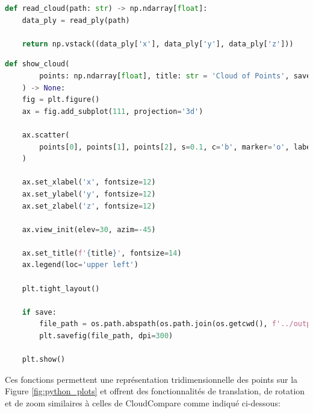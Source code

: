 \documentclass[../5RO17_TP4.tex]{subfiles}
\begin{document}
\begin{scriptsize}\mycode
	\begin{lstlisting}[language=Python, caption=\texttt{read\_cloud()}]
 def read_cloud(path: str) -> np.ndarray[float]:
    data_ply = read_ply(path)

    return np.vstack((data_ply['x'], data_ply['y'], data_ply['z']))
	\end{lstlisting}
\end{scriptsize}

\begin{scriptsize}\mycode
	\begin{lstlisting}[language=Python, caption=\texttt{show\_cloud()}]
def show_cloud(
        points: np.ndarray[float], title: str = 'Cloud of Points', save: bool = False
    ) -> None:
    fig = plt.figure()
    ax = fig.add_subplot(111, projection='3d')

    ax.scatter(
        points[0], points[1], points[2], s=0.1, c='b', marker='o', label=f'{points.shape[1]} points'
    )

    ax.set_xlabel('x', fontsize=12)
    ax.set_ylabel('y', fontsize=12)
    ax.set_zlabel('z', fontsize=12)

    ax.view_init(elev=30, azim=-45)

    ax.set_title(f'{title}', fontsize=14)
    ax.legend(loc='upper left')

    plt.tight_layout()

    if save:
        file_path = os.path.abspath(os.path.join(os.getcwd(), f'../outputs/{title}.png'))
        plt.savefig(file_path, dpi=300)

    plt.show()
	\end{lstlisting}
\end{scriptsize}
\noindent Ces fonctions permettent une représentation tridimensionnelle des points sur la Figure \ref{fig:python_plots} et offrent des fonctionnalités de translation, de rotation et de zoom similaires à celles de CloudCompare comme indiqué ci-dessous:
\end{document}
